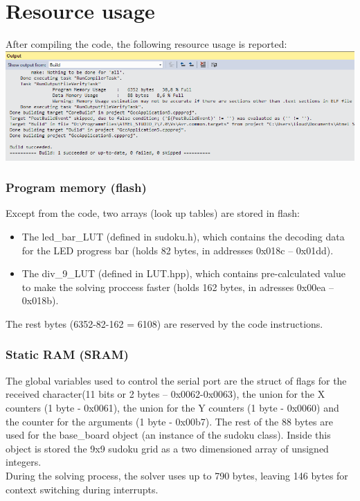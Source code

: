 \documentclass[12pt, a4, hidelinks]{article}
\begin{document}
\section*{Resource usage}
After compiling the code, the following resource usage is reported: \\
\includegraphics[width = \textwidth]{RESOURCES.png} 

\subsubsection*{Program memory (flash)}
Except from the code, two arrays (look up tables) are stored in flash: 
\begin{itemize}
\item The led\_bar\_LUT (defined in sudoku.h), which contains the decoding data for the LED progress bar (holds 82 bytes, in addresses 0x018c -- 0x01dd).
\item The div\_9\_LUT (defined in LUT.hpp), which contains pre-calculated value to make the solving proccess faster (holds 162 bytes, in adresses 0x00ea -- 0x018b).
\end{itemize}
The rest bytes (6352-82-162 = 6108) are reserved by the code instructions.

\subsubsection*{Static RAM (SRAM)}
The global variables used to control the serial port are the struct of flags for the received character(11 bits or 2 bytes -- 0x0062-0x0063), the union for the X counters (1 byte - 0x0061), the union for the Y counters (1 byte - 0x0060) and the counter for the arguments (1 byte - 0x00b7). The rest of the 88 bytes are used for the base\_board object (an instance of the sudoku class). Inside this object is stored the 9x9 sudoku grid as a two dimensioned array of unsigned integers. \\
During the solving process, the solver uses up to 790 bytes, leaving 146 bytes for context switching during interrupts.
\end{document}
